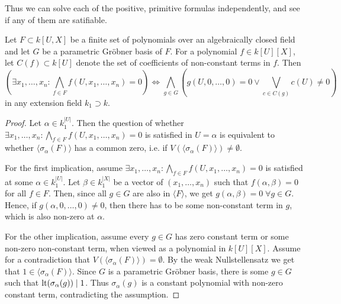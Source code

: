 Thus we can solve each of the positive, primitive formulas independently, and see if any of them are satifiable.

\begin{theorem}
  Let $F \subset k[U, X]$ be a finite set of polynomials over an algebraically closed field and let $G$ be a parametric Gröbner basis of $F$. For a polynomial $f \in k[U][X]$, let $C(f) \subset k[U]$ denote the set of coefficients of non-constant terms in $f$. Then \[ \left(\exists x_{1}, \dots, x_{n} : \bigwedge_{f \in F} f(U, x_{1}, \dots, x_{n}) = 0 \right) \iff \bigwedge_{g \in G} \left( g(U, 0, \dots, 0) = 0 \lor \bigvee_{c \in C(g)} c(U) \neq 0 \right)\] in any extension field $k_{1} \supset k$.
\end{theorem}
\begin{proof}
  Let $\alpha \in k_{1}^{|U|}$. Then the question of whether $\exists x_{1}, \dots, x_{n} : \bigwedge_{f \in F} f(U, x_{1}, \dots, x_{n}) = 0$ is satisfied in $U = \alpha$ is equivalent to whether $\langle \sigma_{\alpha}(F) \rangle$ has a common zero, i.e. if $V(\langle \sigma_{\alpha}(F) \rangle) \neq \emptyset$.

  For the first implication, assume $\exists x_{1}, \dots, x_{n} : \bigwedge_{f \in F} f(U, x_{1}, \dots, x_{n}) = 0$ is satisfied at some $\alpha \in k_{1}^{|U|}$. Let $\beta \in k_{1}^{|X|}$ be a vector of $(x_{1}, \dots, x_{n})$ such that $f(\alpha, \beta) = 0$ for all $f \in F$. Then, since all $g \in G$ are also in $\langle F \rangle$, we get $g(\alpha, \beta) = 0 \; \forall g \in G$. Hence, if $g(\alpha, 0, \dots, 0) \neq 0$, then there has to be some non-constant term in $g$, which is also non-zero at $\alpha$.

  For the other implication, assume every $g \in G$ has zero constant term or some non-zero non-constant term, when viewed as a polynomial in $k[U][X]$. Assume for a contradiction that $V(\langle \sigma_{\alpha}(F) \rangle) = \emptyset$. By the weak Nullstellensatz we get that $1 \in \langle \sigma_{\alpha}(F) \rangle$. Since $G$ is a parametric Gröbner basis, there is some $g \in G$ such that $\operatorname{lt}(\sigma_{\alpha}(g)) \mid 1$. Thus $\sigma_{\alpha}(g)$ is a constant polynomial with non-zero constant term, contradicting the assumption.
\end{proof}


















